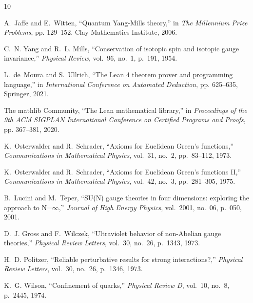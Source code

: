 \documentclass[11pt]{article}
\numberwithin{equation}{section}
\theoremstyle{definition}
\theoremstyle{remark}
\begin{document}
\begin{thebibliography}{10}

A.~Jaffe and E.~Witten,
\newblock ``Quantum {Yang-Mills} theory,''
\newblock in \emph{The Millennium Prize Problems}, pp. 129--152. Clay Mathematics Institute, 2006.

C.~N. Yang and R.~L. Mills,
\newblock ``Conservation of isotopic spin and isotopic gauge invariance,''
\newblock \emph{Physical Review}, vol.~96, no.~1, p.~191, 1954.

L.~de~Moura and S.~Ullrich,
\newblock ``The {Lean} 4 theorem prover and programming language,''
\newblock in \emph{International Conference on Automated Deduction}, pp. 625--635, Springer, 2021.

The mathlib Community,
\newblock ``The {Lean} mathematical library,''
\newblock in \emph{Proceedings of the 9th ACM SIGPLAN International Conference on Certified Programs and Proofs}, pp. 367--381, 2020.

K.~Osterwalder and R.~Schrader,
\newblock ``Axioms for {Euclidean} {Green's} functions,''
\newblock \emph{Communications in Mathematical Physics}, vol.~31, no.~2, pp.~83--112, 1973.

K.~Osterwalder and R.~Schrader,
\newblock ``Axioms for {Euclidean} {Green's} functions {II},''
\newblock \emph{Communications in Mathematical Physics}, vol.~42, no.~3, pp.~281--305, 1975.

B.~Lucini and M.~Teper,
\newblock ``{SU(N)} gauge theories in four dimensions: exploring the approach to {N}=$\infty$,''
\newblock \emph{Journal of High Energy Physics}, vol.~2001, no.~06, p.~050, 2001.

D.~J. Gross and F.~Wilczek,
\newblock ``Ultraviolet behavior of non-{Abelian} gauge theories,''
\newblock \emph{Physical Review Letters}, vol.~30, no.~26, p.~1343, 1973.

H.~D. Politzer,
\newblock ``Reliable perturbative results for strong interactions?,''
\newblock \emph{Physical Review Letters}, vol.~30, no.~26, p.~1346, 1973.

K.~G. Wilson,
\newblock ``Confinement of quarks,''
\newblock \emph{Physical Review D}, vol.~10, no.~8, p.~2445, 1974.


\end{thebibliography}
\end{document}
